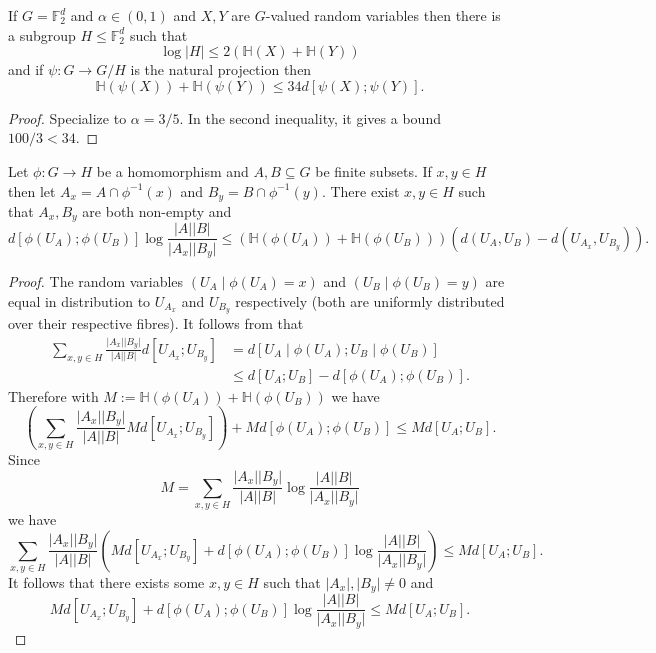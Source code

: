 \begin{lemma}\label{pfr-projection}\leanok
If $G=\mathbb{F}_2^d$ and $\alpha\in (0,1)$ and $X,Y$ are $G$-valued random
variables then there is a subgroup $H\leq \mathbb{F}_2^d$ such that
\[\log \lvert H\rvert \leq 2 (\mathbb{H}(X)+\mathbb{H}(Y))\]
and if $\psi:G \to G/H$ is the natural projection then
\[\mathbb{H}(\psi(X))+\mathbb{H}(\psi(Y))\leq 34 d[\psi(X);\psi(Y)].\]
\end{lemma}
\begin{proof}\leanok
Specialize  to $\alpha=3/5$. In the second
inequality, it gives a bound $100/3 < 34$.
\end{proof}



\begin{lemma}\label{single-fibres}\leanok
Let $\phi:G\to H$ be a homomorphism and $A,B\subseteq G$ be finite subsets. If $x,y\in H$ then let $A_x=A\cap \phi^{-1}(x)$ and $B_y=B\cap \phi^{-1}(y)$. There exist $x,y\in H$ such that $A_x,B_y$ are both non-empty and
\[d[\phi(U_A);\phi(U_B)]\log \frac{\lvert A\rvert\lvert B\rvert}{\lvert A_x\rvert\lvert B_y\rvert}\leq (\mathbb{H}(\phi(U_A))+\mathbb{H}(\phi(U_B)))(d(U_A,U_B)-d(U_{A_x},U_{B_y})).\]
\end{lemma}
\begin{proof}\leanok
The random variables $(U_A\mid \phi(U_A)=x)$ and $(U_B\mid \phi(U_B)=y)$ are equal in distribution to $U_{A_x}$ and $U_{B_y}$ respectively (both are uniformly distributed over their respective fibres). It follows from  that
\begin{align*}
\sum_{x,y\in H}\frac{\lvert A_x\rvert\lvert B_y\rvert}{\lvert A\rvert\lvert B\rvert}d[U_{A_x};U_{B_y}]
&=d[U_A\mid \phi(U_A); U_B\mid \phi(U_B)]\\
&\leq d[U_A;U_B]-d[\phi(U_A);\phi(U_B)].
\end{align*}
Therefore with $M:=\mathbb{H}(\phi(U_A))+\mathbb{H}(\phi(U_B))$ we have
\[\left(\sum_{x,y\in H}\frac{\lvert A_x\rvert\lvert B_y\rvert}{\lvert A\rvert\lvert B\rvert}Md[U_{A_x};U_{B_y}]\right)+Md[\phi(U_A);\phi(U_B)]\leq Md[U_A;U_B].\]
Since
\[M=\sum_{x,y\in H}\frac{\lvert A_x\rvert\lvert B_y\rvert}{\lvert A\rvert\lvert B\rvert}\log \frac{\lvert A\rvert\lvert B\rvert}{\lvert A_x\rvert\lvert B_y\rvert}\]
we have
\[\sum_{x,y\in H} \frac{\lvert A_x\rvert\lvert B_y\rvert}{\lvert A\rvert\lvert B\rvert}\left(Md[U_{A_x};U_{B_y}]+d[\phi(U_A);\phi(U_B)]\log \frac{\lvert A\rvert\lvert B\rvert}{\lvert A_x\rvert\lvert B_y\rvert}\right)\leq  Md[U_A;U_B].\]
It follows that there exists some $x,y\in H$ such that $\lvert A_x\rvert,\lvert B_y\rvert\neq 0$ and
\[Md[U_{A_x};U_{B_y}]+d[\phi(U_A);\phi(U_B)]\log \frac{\lvert A\rvert\lvert B\rvert}{\lvert A_x\rvert\lvert B_y\rvert}\leq  Md[U_A;U_B].\]
\end{proof}


